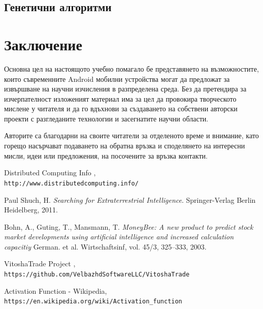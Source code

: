 \documentclass[book,14pt,oneside,openany]{memoir}
\begin{document}
\section{Генетични алгоритми}

\newpage
{}
\chapter*{Заключение}

Основна цел на настоящото учебно помагало бе представянето на възможностите, които съвременните Android мобилни устройства могат да предложат за извършване на научни изчисления в разпределена среда. Без да претендира за изчерпателност изложеният материал има за цел да провокира творческото мислене у читателя и да го вдъхнови за създаването на собствени авторски проекти с разгледаните технологии и засегнатите научни области.  

Авторите са благодарни на своите читатели за отделеното време и внимание, като горещо насърчават подаването на обратна връзка и споделянето на интересни мисли, идеи или предложения, на посочените за връзка контакти.

\newpage
\begin{thebibliography}{99}

 Distributed Computing Info , \\\texttt{http://www.distributedcomputing.info/}

 Paul Shuch, H. \textit{Searching for Extraterrestrial Intelligence}. Springer-Verlag Berlin Heidelberg, 2011.

 Bohn, A., Guting, T., Mansmann, T. \textit{MoneyBee: A new product to predict stock market developments using artificial intelligence and increased calculation capacitiy} German. et al. Wirtschaftsinf, vol. 45/3, 325--333, 2003.

 VitoshaTrade Project , \\\texttt{https://github.com/VelbazhdSoftwareLLC/VitoshaTrade}

 Activation Function - Wikipedia, \\\texttt{https://en.wikipedia.org/wiki/Activation\_function}

\end{thebibliography}

\newpage
\listoffigures


\newpage
\printindex
\end{document}
